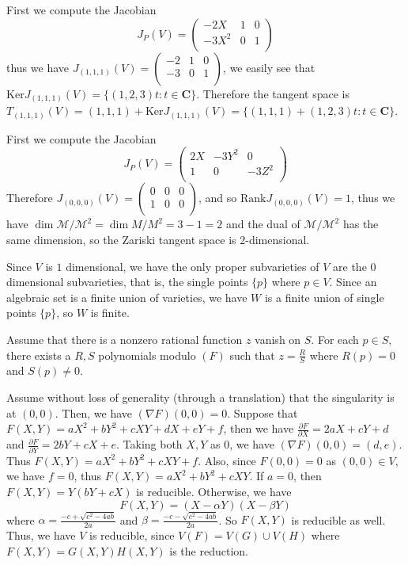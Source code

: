 \documentclass[11pt]{book}
\begin{document}
\begin{problem}
First we compute the Jacobian
\[J_P(V)=\begin{pmatrix}
-2X&1&0\\
-3X^2&0&1\\
\end{pmatrix}\]
thus we have $J_{(1,1,1)}(V)=\begin{pmatrix}-2&1&0\\-3&0&1\\\end{pmatrix}$, we easily see that $\mathrm{Ker}J_{(1,1,1)}(V)=\{(1,2,3)t:t\in\mathbf C\}$. Therefore the tangent space is $T_{(1,1,1)}(V)=(1,1,1)+\mathrm{Ker}J_{(1,1,1)}(V)=\{(1,1,1)+(1,2,3)t:t\in\mathbf C\}$.
\end{problem}
\begin{problem}
First we compute the Jacobian 
\[J_{P}(V)=\begin{pmatrix}
2X&-3Y^2&0\\
1&0&-3Z^2\\
\end{pmatrix}\]
Therefore $J_{(0,0,0)}(V)=\begin{pmatrix}
0&0&0\\
1&0&0\\
\end{pmatrix}$, and so $\mathrm{Rank}J_{(0,0,0)}(V)=1$, thus we have $\dim \mathcal{M}/\mathcal{M}^2=\dim M/M^2=3-1=2$ and the dual of $\mathcal{M}/\mathcal{M}^2$ has the same dimension, so the Zariski tangent space is $2$-dimensional.
\end{problem}
\begin{problem}Since $V$ is $1$ dimensional, we have the only proper subvarieties of $V$ are the $0$ dimensional subvarieties, that is, the single points $\{p\}$ where $p\in V$. Since an algebraic set is a finite union of varieties, we have $W$ is a finite union of single points $\{p\}$, so $W$ is finite.
\end{problem}
\begin{problem}
Assume that there is a nonzero rational function $z$ vanish on $S$. For each $p\in S$, there exists a $R,S$ polynomials modulo $(F)$ such that $z=\frac{R}{S}$ where $R(p)=0$ and $S(p)\ne 0$.
\end{problem}
\begin{problem}
Assume without loss of generality (through a translation) that the singularity is at $(0,0)$. Then, we have $(\nabla F)(0,0)= 0$. Suppose that $F(X,Y)=aX^2+bY^2+cXY+dX+eY+f$, then we have $\frac{\partial F}{\partial X}=2aX+cY+d$ and $\frac{\partial F}{\partial Y}=2bY+cX+e$. Taking both $X,Y$ as $0$, we have $(\nabla F)(0,0)=(d,e)$. Thus $F(X,Y)=aX^2+bY^2+cXY+f$. Also, since $F(0,0)=0$ as $(0,0)\in V$, we have $f=0$, thus $F(X,Y)=aX^2+bY^2+cXY$. If $a=0$, then $F(X,Y)=Y(bY+cX)$ is reducible. Otherwise, we have 
\[F(X,Y)=\left(X-\alpha Y\right)\left(X-\beta Y\right)\]
where $\alpha=\frac{-c+\sqrt{c^2-4ab}}{2a}$ and $\beta=\frac{-c-\sqrt{c^2-4ab}}{2a}$. So $F(X,Y)$ is reducible as well. Thus, we have $V$ is reducible, since $V(F)=V(G)\cup V(H)$ where $F(X,Y)=G(X,Y)H(X,Y)$ is the reduction.
\end{problem}
\end{document}
